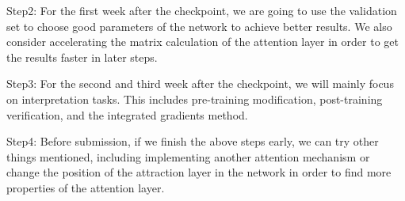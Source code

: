 \documentclass[12pt]{article}
\begin{document}
Step2: For the first week after the checkpoint, we are going to use the validation set to choose good parameters of the network to achieve better results. We also consider accelerating the matrix calculation of the attention layer in order to get the results faster in later steps.

Step3: For the second and third week after the checkpoint, we will mainly focus on interpretation tasks. This includes pre-training modification, post-training verification, and the integrated gradients method.

Step4: Before submission, if we finish the above steps early, we can try other things mentioned, including implementing another attention mechanism or change the position of the attraction layer in the network in order to find more properties of the attention layer.

%
\newpage



\end{document}
